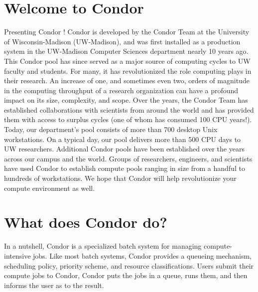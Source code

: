 \section{Welcome to Condor}  
%
% 
%

\label{sec:usermanual}
Presenting Condor \VersionNotice! Condor is developed by
the Condor Team at the University of Wisconsin-Madison (UW-Madison), and
was first installed as a production system in the UW-Madison Computer
Sciences department nearly 10 years ago. This Condor pool has since
served as a major source of computing cycles to UW faculty and students.
For many, it has revolutionized the role computing plays in their
research. An increase of one, and sometimes even two, orders of
magnitude in the computing throughput of a research organization can
have a profound impact on its size, complexity, and scope. Over the
years, the Condor Team has established collaborations with scientists
from around the world and has provided them with access to surplus
cycles (one of whom has consumed 100 CPU years!). Today, our
department's pool consists of more than 700 desktop Unix workstations.
On a typical day, our pool delivers more than 500 CPU days to UW
researchers. Additional Condor pools have been established over the
years across our campus and the world. Groups of researchers, engineers,
and scientists have used Condor to establish compute pools ranging in
size from a handful to hundreds of workstations. We hope that Condor
will help revolutionize your compute environment as well.


\section{What does Condor do?}


In a nutshell, Condor is a specialized batch system 
for managing compute-intensive jobs.
Like most batch systems, Condor provides a
queueing mechanism, scheduling policy, priority scheme, and resource
classifications.  Users submit their compute jobs to Condor, Condor puts
the jobs in a queue, runs them, and then informs the user as to the
result.

